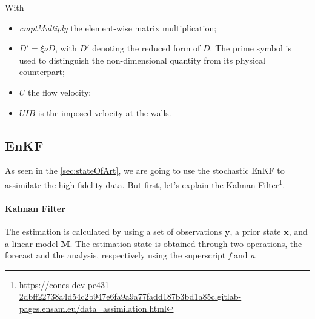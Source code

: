 With
\begin{itemize}
    \item \textit{cmptMultiply} the element-wise matrix multiplication;
    \item $D' = \xi \nu D$, with $D'$ denoting the reduced form of $D$. The prime symbol is used to distinguish the non-dimensional quantity from its physical counterpart;
    \item $U$ the flow velocity;
    \item $UIB$ is the imposed velocity at the walls. %
\end{itemize}





\subsection{EnKF}
\label{subsec:EnKF}


As seen in the \autoref{sec:stateOfArt}, we are going to use the stochastic EnKF to assimilate the high-fidelity data.
But first, let's explain the Kalman Filter\footnote{\url{https://cones-dev-pe431-2dbff22738a4d54c2b947e6fa9a9a77fadd187b3bd1a85c.gitlab-pages.ensam.eu/data_assimilation.html}}.

\paragraph{Kalman Filter}

The estimation is calculated by using a set of observations $\mathbf{y}$, a prior state $\mathbf{x}$, and a linear model $\mathbf{M}$. The estimation state is obtained through two operations, the forecast and the analysis, respectively using the superscript \textit{f} and \textit{a}.

